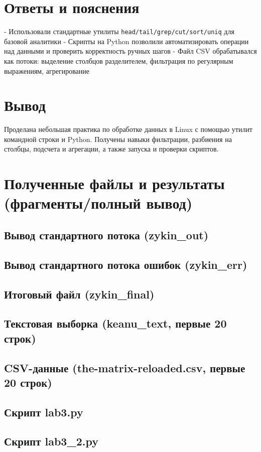 \section{Ответы и пояснения}
- Использовали стандартные утилиты \texttt{head/tail/grep/cut/sort/uniq} для базовой аналитики
- Скрипты на Python позволили автоматизировать операции над данными и проверить корректность ручных шагов
- Файл CSV обрабатывался как потоки: выделение столбцов разделителем, фильтрация по регулярным выражениям, агрегирование

\section{Вывод}
Проделана небольшая практика по обработке данных в Linux с помощью утилит командной строки и Python. Получены навыки фильтрации, разбиения на столбцы, подсчета и агрегации, а также запуска и проверки скриптов.

\section{Полученные файлы и результаты (фрагменты/полный вывод)}

\subsection{Вывод стандартного потока (zykin\_out)}


\subsection{Вывод стандартного потока ошибок (zykin\_err)}


\subsection{Итоговый файл (zykin\_final)}


\subsection{Текстовая выборка (keanu\_text, первые 20 строк)}


\subsection{CSV-данные (the-matrix-reloaded.csv, первые 20 строк)}


\subsection{Скрипт lab3.py}


\subsection{Скрипт lab3\_2.py}


